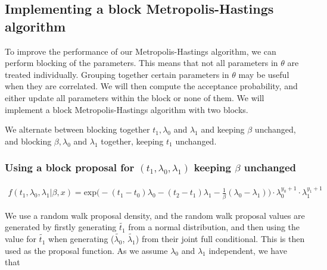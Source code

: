 


\subsection{Implementing a block Metropolis-Hastings algorithm}

To improve the performance of our Metropolis-Hastings algorithm, we can perform blocking of the parameters. This means that not all parameters in $\theta$ are treated individually. Grouping together certain parameters in $\theta$ may be useful when they are correlated. We will then compute the acceptance probability, and either update all parameters within the block or none of them. We will implement a block Metropolis-Hastings algorithm with two blocks.


We alternate between blocking together $t_1, \lambda_0$ and  $ \lambda_1$ and keeping $\beta$ unchanged, and blocking $\beta, \lambda_0$ and $\lambda_1$ together, keeping $t_1$ unchanged.


\subsubsection{Using a block proposal for $(t_1, \lambda_0, \lambda_1)$ keeping $\beta$ unchanged}

\begin{align}
    f(t_1, \lambda_0, \lambda_1|\beta, x) = \text{exp} \Big( -(t_1-t_0)\lambda_0 -(t_2-t_1)\lambda_1 - \frac{1}{\beta}(\lambda_0 - \lambda_1)\Big) \cdot\lambda_0^{y_0 + 1} \cdot \lambda_1^{y_1 + 1} 
\end{align}

We use a random walk proposal density, and the random walk proposal values are generated by firstly generating $\widetilde{t_1}$ from a normal distribution, and then using the value for $\widetilde{t_1}$ when generating ($\widetilde{\lambda_0}$, $\widetilde{\lambda_1}$) from their joint full conditional. This is then used as the proposal function. As we assume $\lambda_0$ and $\lambda_1$ independent, we have that 

